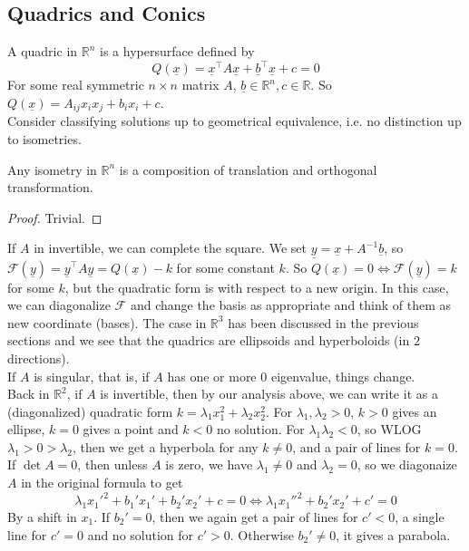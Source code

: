 \subsection{Quadrics and Conics}
A quadric in $\mathbb R^n$ is a hypersurface defined by
$$Q(\underline{x})=\underline{x}^\top A\underline{x}+\underline{b}^\top\underline{x}+c=0$$
For some real symmetric $n\times n$ matrix $A$, $\underline{b}\in \mathbb R^n,c\in\mathbb R$.
So $Q(\underline{x})=A_{ij}x_ix_j+b_ix_i+c$.\\
Consider classifying solutions up to geometrical equivalence, i.e. no distinction up to isometries.
\begin{theorem}
    Any isometry in $\mathbb R^n$ is a composition of translation and orthogonal transformation.
\end{theorem}
\begin{proof}
    Trivial.
\end{proof}
If $A$ in invertible, we can complete the square.
We set $\underline{y}=\underline{x}+A^{-1}\underline{b}$, so $\mathcal{F}(\underline{y})=\underline{y}^\top A\underline{y}=Q(\underline{x})-k$ for some constant $k$.
So $Q(\underline{x})=0\iff \mathcal F(\underline{y})=k$ for some $k$, but the quadratic form is with respect to a new origin.
In this case, we can diagonalize $\mathcal F$ and change the basis as appropriate and think of them as new coordinate (bases).
The case in $\mathbb R^3$ has been discussed in the previous sections and we see that the quadrics are ellipsoids and hyperboloids (in $2$ directions).\\
If $A$ is singular, that is, if $A$ has one or more $0$ eigenvalue, things change.\\
Back in $\mathbb R^2$, if $A$ is invertible, then by our analysis above, we can write it as a (diagonalized) quadratic form $k=\lambda_1x_1^2+\lambda_2x_2^2$.
For $\lambda_1,\lambda_2>0$, $k>0$ gives an ellipse, $k=0$ gives a point and $k<0$ no solution.
For $\lambda_1\lambda_2<0$, so WLOG $\lambda_1>0>\lambda_2$, then we get a hyperbola for any $k\neq 0$, and a pair of lines for $k=0$.\\
If $\det A=0$, then unless $A$ is zero, we have $\lambda_1\neq 0$ and $\lambda_2=0$, so we diagonaize $A$ in the original formula to get
$$\lambda_1x_1'^2+b_1'x_1'+b_2'x_2'+c=0\iff \lambda_1x_1''^2+b_2'x_2'+c'=0$$
By a shift in $x_1$.
If $b_2'=0$, then we again get a pair of lines for $c'<0$, a single line for $c'=0$ and no solution for $c'>0$.
Otherwise $b_2'\neq 0$, it gives a parabola.\\
